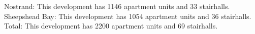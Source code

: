 {Nostrand}: This development has 1146 apartment units and 33 stairhalls.\\{Sheepshead Bay}: This development has 1054 apartment units and 36 stairhalls.\\{Total}: This development has 2200 apartment units and 69 stairhalls.\\